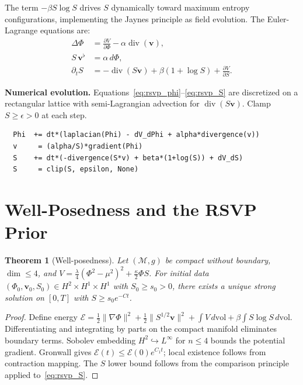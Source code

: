 \documentclass[11pt, openright, twoside]{book}
\theoremstyle{plain}
\newtheorem{theorem}{Theorem}[chapter]
\theoremstyle{definition}
\theoremstyle{remark}
\newcommand{\vfield}{\mathbf{v}}
\newcommand{\Sfield}{S}
\begin{document}
The term $-\beta\Sfield\log\Sfield$ drives $\Sfield$ dynamically toward maximum entropy
configurations, implementing the Jaynes principle as field evolution. The Euler-Lagrange
equations are:
\begin{align}
  \Delta\Phi &= \tfrac{\partial V}{\partial\Phi} - \alpha\operatorname{div}(\vfield),
  \label{eq:rsvp_phi}\\
  \Sfield\,\vfield^\flat &= \alpha\,d\Phi,
  \label{eq:rsvp_v}\\
  \partial_t\Sfield &= -\operatorname{div}(\Sfield\vfield)
  + \beta(1+\log\Sfield) + \tfrac{\partial V}{\partial\Sfield}.
  \label{eq:rsvp_S}
\end{align}

\begin{implbox}
\textbf{Numerical evolution.} Equations~\eqref{eq:rsvp_phi}--\eqref{eq:rsvp_S} are
discretized on a rectangular lattice with semi-Lagrangian advection for
$\operatorname{div}(\Sfield\vfield)$. Clamp $\Sfield\geq\epsilon>0$ at each step.
\begin{verbatim}
  Phi  += dt*(laplacian(Phi) - dV_dPhi + alpha*divergence(v))
  v     = (alpha/S)*gradient(Phi)
  S    += dt*(-divergence(S*v) + beta*(1+log(S)) + dV_dS)
  S     = clip(S, epsilon, None)
\end{verbatim}
\end{implbox}

\section{Well-Posedness and the RSVP Prior}

\begin{theorem}[Well-posedness]
\label{thm:rsvp_wellposed}
Let $(\mathcal{M},g)$ be compact without boundary, $\dim\leq 4$, and
$V=\frac{\lambda}{4}(\Phi^2-\mu^2)^2+\frac{\kappa}{2}\Phi\Sfield$.
For initial data $(\Phi_0,\vfield_0,\Sfield_0)\in H^2\times H^1\times H^1$ with
$\Sfield_0\geq s_0>0$, there exists a unique strong solution on $[0,T]$ with
$\Sfield\geq s_0 e^{-Ct}$.
\end{theorem}

\begin{proof}
Define energy $\mathcal{E}=\frac{1}{2}\|\nabla\Phi\|^2+\frac{1}{2}\|\Sfield^{1/2}\vfield\|^2
+\int V\,d\mathrm{vol}+\beta\int\Sfield\log\Sfield\,d\mathrm{vol}$.
Differentiating and integrating by parts on the compact manifold eliminates boundary terms.
Sobolev embedding $H^2\hookrightarrow L^\infty$ for $n\leq 4$ bounds the potential gradient.
Gronwall gives $\mathcal{E}(t)\leq\mathcal{E}(0)e^{C_1 t}$; local existence follows from
contraction mapping. The $\Sfield$ lower bound follows from the comparison principle applied
to~\eqref{eq:rsvp_S}.
\end{proof}
\end{document}
